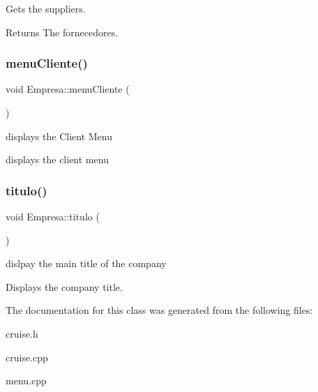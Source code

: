 Gets the suppliers. 

\begin{DoxyReturn}{Returns}
The fornecedores. 
\end{DoxyReturn}
\mbox{\label{classEmpresa_a2e8e13ecd162403da0118ceccdccbbcb}} 
\subsubsection{\texorpdfstring{menu\+Cliente()}{menuCliente()}}
{\footnotesize\ttfamily void Empresa\+::menu\+Cliente (\begin{DoxyParamCaption}{ }\end{DoxyParamCaption})}



displays the Client Menu 

displays the client menu \mbox{\label{classEmpresa_ad79f7196a8ce7256771cbd7b9542155c}} 
\subsubsection{\texorpdfstring{titulo()}{titulo()}}
{\footnotesize\ttfamily void Empresa\+::titulo (\begin{DoxyParamCaption}{ }\end{DoxyParamCaption})}



dislpay the main title of the company 

Displays the company title. 

The documentation for this class was generated from the following files\+:\begin{DoxyCompactItemize}
\item 
cruise.\+h\item 
cruise.\+cpp\item 
menu.\+cpp\end{DoxyCompactItemize}
